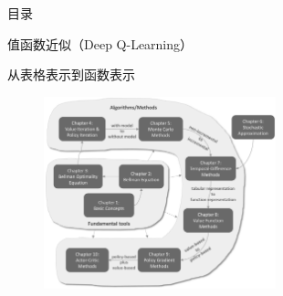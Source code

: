 \begin{frame}{目录}
    \tableofcontents
\end{frame}

\begin{section}{值函数近似\alert{（Deep Q-Learning）}}

\begin{frame}{从表格表示到函数表示}
    \begin{figure}
        \centering
        \includegraphics[width=0.6\textwidth]{assets/Figure_chapterMap.png}
    \end{figure}
\end{frame}

\end{section}